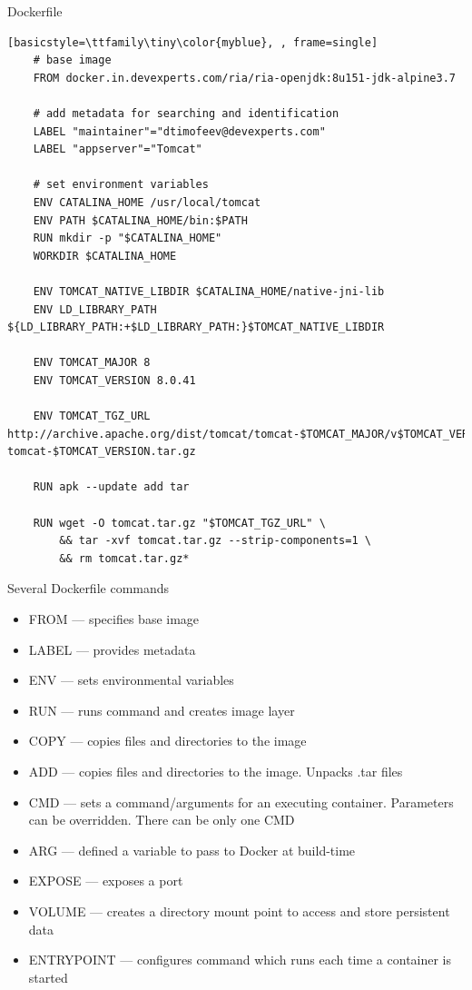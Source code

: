 \begin{frame}[fragile]{Dockerfile}
  \begin{lstlisting}[basicstyle=\ttfamily\tiny\color{myblue}, , frame=single]
    # base image
    FROM docker.in.devexperts.com/ria/ria-openjdk:8u151-jdk-alpine3.7
    
    # add metadata for searching and identification
    LABEL "maintainer"="dtimofeev@devexperts.com"
    LABEL "appserver"="Tomcat"
    
    # set environment variables
    ENV CATALINA_HOME /usr/local/tomcat
    ENV PATH $CATALINA_HOME/bin:$PATH
    RUN mkdir -p "$CATALINA_HOME"
    WORKDIR $CATALINA_HOME

    ENV TOMCAT_NATIVE_LIBDIR $CATALINA_HOME/native-jni-lib
    ENV LD_LIBRARY_PATH ${LD_LIBRARY_PATH:+$LD_LIBRARY_PATH:}$TOMCAT_NATIVE_LIBDIR

    ENV TOMCAT_MAJOR 8
    ENV TOMCAT_VERSION 8.0.41

    ENV TOMCAT_TGZ_URL http://archive.apache.org/dist/tomcat/tomcat-$TOMCAT_MAJOR/v$TOMCAT_VERSION/bin/apache-tomcat-$TOMCAT_VERSION.tar.gz

    RUN apk --update add tar

    RUN wget -O tomcat.tar.gz "$TOMCAT_TGZ_URL" \
        && tar -xvf tomcat.tar.gz --strip-components=1 \
        && rm tomcat.tar.gz*

  \end{lstlisting}  
\end{frame}

\begin{frame}{Several Dockerfile commands}
  \begin{itemize}
    \item FROM  --- specifies base image
    \item LABEL --- provides metadata
    \item ENV   --- sets environmental variables
    \item RUN   --- runs command and creates image layer
    \item COPY  --- copies files and directories to the image
    \item ADD   --- copies files and directories to the image. Unpacks .tar files
    \item CMD   --- sets a command/arguments for an executing container. Parameters can be overridden. There can be only one CMD
    \item ARG   --- defined a variable to pass to Docker at build-time
    \item EXPOSE --- exposes a port
    \item VOLUME --- creates a directory mount point to access and store persistent data
    \item ENTRYPOINT --- configures command which runs each time a container is started
  \end{itemize}    
\end{frame}

